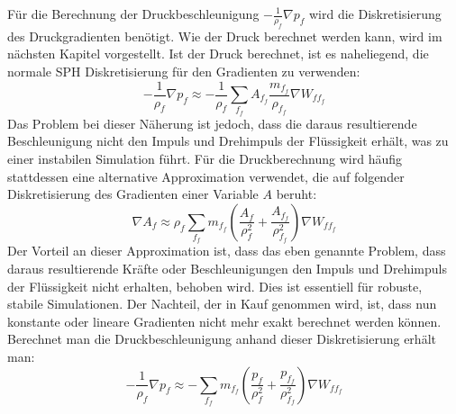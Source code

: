 \documentclass[11pt,
a4paper,
parskip=half, %
BCOR=10mm, %
english,
ngerman]{scrreprt}
\begin{document}
Für die Berechnung der Druckbeschleunigung $-\frac{1}{\rho_f} \nabla p_f$ wird die Diskretisierung des Druckgradienten benötigt.
Wie der Druck berechnet werden kann, wird im nächsten Kapitel vorgestellt.
Ist der Druck berechnet, ist es naheliegend, die normale SPH Diskretisierung für den Gradienten zu verwenden:
\begin{equation}
    -\frac{1}{\rho_f} \nabla p_f \approx -\frac{1}{\rho_f} \sum_{f_f} A_{f_f} \frac{m_{f_f}}{\rho_{f_f}} \nabla W_{ff_f}
\end{equation}
Das Problem bei dieser Näherung ist jedoch, dass die daraus resultierende Beschleunigung nicht den Impuls und Drehimpuls der Flüssigkeit erhält,
was zu einer instabilen Simulation führt.
Für die Druckberechnung wird häufig stattdessen eine alternative Approximation verwendet,
die auf folgender Diskretisierung des Gradienten einer Variable $A$ beruht:
\begin{equation}
    \nabla A_f \approx \rho_f \sum_{f_f} m_{f_f} \left( \frac{A_f}{\rho_f^2} + \frac{A_{f_f}}{\rho_{f_f}^2} \right) \nabla W_{ff_f}
\end{equation}
Der Vorteil an dieser Approximation ist, dass das eben genannte Problem,
dass daraus resultierende Kräfte oder Beschleunigungen den Impuls und Drehimpuls der Flüssigkeit nicht erhalten, behoben wird.
Dies ist essentiell für robuste, stabile Simulationen.
Der Nachteil, der in Kauf genommen wird, ist, dass nun konstante oder lineare Gradienten nicht mehr exakt berechnet werden können.
Berechnet man die Druckbeschleunigung anhand dieser Diskretisierung erhält man:
\begin{equation}
    -\frac{1}{\rho_f} \nabla p_f \approx -\sum_{f_f} m_{f_f} \left( \frac{p_f}{\rho_f^2} + \frac{p_{f_f}}{\rho_{f_f}^2} \right) \nabla W_{ff_f}
\end{equation}
\end{document}
